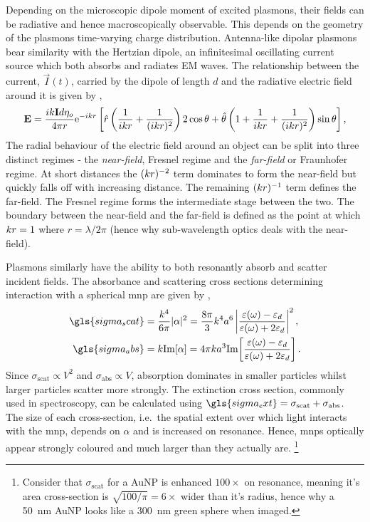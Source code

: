 \documentclass{article}
\begin{document}
Depending on the microscopic dipole moment of excited plasmons, their fields can be radiative and hence macroscopically observable. This depends on the geometry of the plasmons time-varying charge distribution. Antenna-like dipolar plasmons bear similarity with the Hertzian dipole, an infinitesimal oscillating current source which both absorbs and radiates EM waves. The relationship between the current, $\vec{I}(t)$, carried by the dipole of length $d$ and the radiative electric field around it is given by \cite{grant2013electromagnetism},
\begin{equation}
	\mathbf{E} = \frac{ik\mathbf{I}d\eta_o}{4\pi r} \mathrm{e}^{-ikr} \left[ \hat{r} \left( \frac{1}{ikr} + \frac{1}{(ikr)^2} \right) 2\cos\theta + \hat{\theta} \left( 1 + \frac{1}{ikr} + \frac{1}{(ikr)^2} \right) \sin\theta \right],
\end{equation}
The radial behaviour of the electric field around an object can be split into three distinct regimes - the \emph{near-field}, Fresnel regime and the \emph{far-field} or Fraunhofer regime. At short distances the $(k r)^{-2}$ term dominates to form the near-field but quickly falls off with increasing distance. The remaining $(k r)^{-1}$ term defines the far-field. The Fresnel regime forms the intermediate stage between the two. The boundary between the near-field and the far-field is defined as the point at which $k r=1$ where $r = \lambda/2\pi$ (hence why sub-wavelength optics deals with the near-field).

Plasmons similarly have the ability to both resonantly absorb and scatter incident fields. The absorbance and scattering cross sections determining interaction with a spherical \gls{mnp} are given by \cite{bohren2008absorption},
\begin{subequations}
\begin{align}
	\gls{sigma_scat} &= \frac{\wvm^4}{6\pi} |\alpha|^2 = \frac{8\pi}{3}\wvm^4a^6 \left| \frac{\dielectric - \epsdi}{\dielectric + 2\epsdi} \right|^2, \\
	\gls{sigma_abs} &= \wvm\imag{\alpha} = 4\pi \wvm a^3 \imag{ \frac{\dielectric - \epsdi}{\dielectric + 2\epsdi} }.
\end{align}
\end{subequations}
Since $\sigma_{\mathrm{scat}} \propto V^2$ and $\sigma_{\mathrm{abs}} \propto V$, absorption dominates in smaller particles whilst larger particles scatter more strongly. The extinction cross section, commonly used in spectroscopy, can be calculated using $\gls{sigma_ext}=\sigma_{\mathrm{scat}}+\sigma_{\mathrm{abs}}$. The size of each cross-section, i.e.\ the spatial extent over which light interacts with the \gls{mnp}, depends on $\alpha$ and is increased on resonance. Hence, \glspl{mnp} optically appear strongly coloured and much larger than they actually are.%
\footnote{Consider that $\sigma_{\mathrm{scat}}$ for a AuNP is enhanced $100\times$ on resonance, meaning it's area cross-section is $\sqrt{100/\pi}= 6\times$ wider than it's radius, hence why a \SI{50}{nm} AuNP looks like a \SI{300}{nm} green sphere when imaged.}
\end{document}
